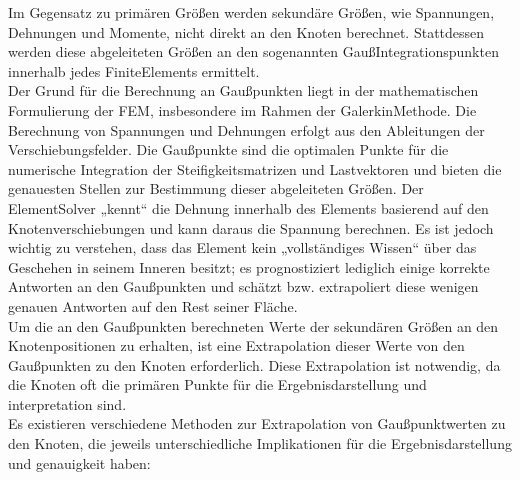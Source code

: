 \documentclass[letterpaper,10pt,german]{jupyterBook}
\begin{document}
\sphinxAtStartPar
Im Gegensatz zu primären Größen werden sekundäre Größen, wie Spannungen, Dehnungen und Momente, nicht direkt an den Knoten berechnet. Stattdessen werden diese abgeleiteten Größen an den sogenannten Gauß\sphinxhyphen{}Integrationspunkten innerhalb jedes Finite\sphinxhyphen{}Elements ermittelt.\\
Der Grund für die Berechnung an Gaußpunkten liegt in der mathematischen Formulierung der FEM, insbesondere im Rahmen der Galerkin\sphinxhyphen{}Methode. Die Berechnung von Spannungen und Dehnungen erfolgt aus den Ableitungen der Verschiebungsfelder. Die Gaußpunkte sind die optimalen Punkte für die numerische Integration der Steifigkeitsmatrizen und Lastvektoren und bieten die genauesten Stellen zur Bestimmung dieser abgeleiteten Größen. Der Element\sphinxhyphen{}Solver „kennt“ die Dehnung innerhalb des Elements basierend auf den Knotenverschiebungen und kann daraus die Spannung berechnen. Es ist jedoch wichtig zu verstehen, dass das Element kein „vollständiges Wissen“ über das Geschehen in seinem Inneren besitzt; es prognostiziert lediglich einige korrekte Antworten an den Gaußpunkten und schätzt bzw. extrapoliert diese wenigen genauen Antworten auf den Rest seiner Fläche.\\
Um die an den Gaußpunkten berechneten Werte der sekundären Größen an den Knotenpositionen zu erhalten, ist eine Extrapolation dieser Werte von den Gaußpunkten zu den Knoten erforderlich. Diese Extrapolation ist notwendig, da die Knoten oft die primären Punkte für die Ergebnisdarstellung und \sphinxhyphen{}interpretation sind.\\
Es existieren verschiedene Methoden zur Extrapolation von Gaußpunktwerten zu den Knoten, die jeweils unterschiedliche Implikationen für die Ergebnisdarstellung und \sphinxhyphen{}genauigkeit haben:
\end{document}

